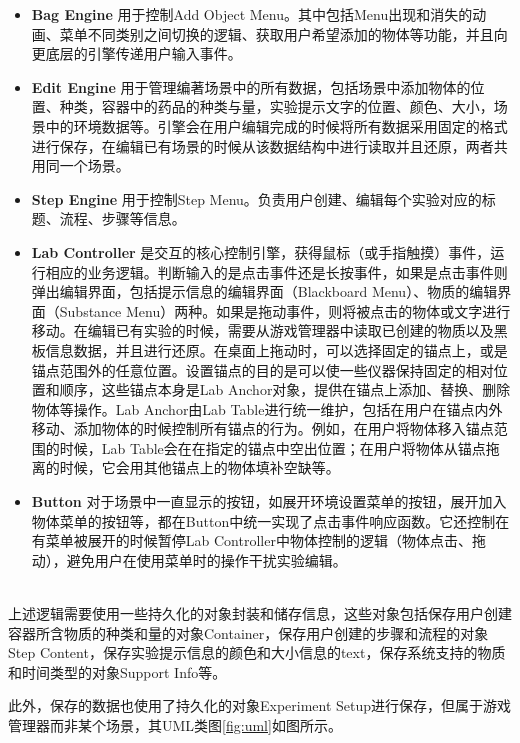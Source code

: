\begin{itemize}
    \item \textbf{Bag Engine}
用于控制Add Object Menu。其中包括Menu出现和消失的动画、菜单不同类别之间切换的逻辑、获取用户希望添加的物体等功能，并且向更底层的引擎传递用户输入事件。
    
    \item \textbf{Edit Engine}
用于管理编著场景中的所有数据，包括场景中添加物体的位置、种类，容器中的药品的种类与量，实验提示文字的位置、颜色、大小，场景中的环境数据等。引擎会在用户编辑完成的时候将所有数据采用固定的格式进行保存，在编辑已有场景的时候从该数据结构中进行读取并且还原，两者共用同一个场景。
    
    \item \textbf{Step Engine}
用于控制Step Menu。负责用户创建、编辑每个实验对应的标题、流程、步骤等信息。

    \item \textbf{Lab Controller}
是交互的核心控制引擎，获得鼠标（或手指触摸）事件，运行相应的业务逻辑。判断输入的是点击事件还是长按事件，如果是点击事件则弹出编辑界面，包括提示信息的编辑界面（Blackboard Menu）、物质的编辑界面（Substance Menu）两种。如果是拖动事件，则将被点击的物体或文字进行移动。在编辑已有实验的时候，需要从游戏管理器中读取已创建的物质以及黑板信息数据，并且进行还原。在桌面上拖动时，可以选择固定的锚点上，或是锚点范围外的任意位置。设置锚点的目的是可以使一些仪器保持固定的相对位置和顺序，这些锚点本身是Lab Anchor对象，提供在锚点上添加、替换、删除物体等操作。Lab Anchor由Lab Table进行统一维护，包括在用户在锚点内外移动、添加物体的时候控制所有锚点的行为。例如，在用户将物体移入锚点范围的时候，Lab Table会在在指定的锚点中空出位置；在用户将物体从锚点拖离的时候，它会用其他锚点上的物体填补空缺等。

    \item \textbf{Button}
对于场景中一直显示的按钮，如展开环境设置菜单的按钮，展开加入物体菜单的按钮等，都在Button中统一实现了点击事件响应函数。它还控制在有菜单被展开的时候暂停Lab Controller中物体控制的逻辑（物体点击、拖动），避免用户在使用菜单时的操作干扰实验编辑。
\end{itemize}
~\\
\indent    	上述逻辑需要使用一些持久化的对象封装和储存信息，这些对象包括保存用户创建容器所含物质的种类和量的对象Container，保存用户创建的步骤和流程的对象Step Content，保存实验提示信息的颜色和大小信息的text，保存系统支持的物质和时间类型的对象Support Info等。

此外，保存的数据也使用了持久化的对象Experiment Setup进行保存，但属于游戏管理器而非某个场景，其UML类图\ref{fig:uml}如图所示。



